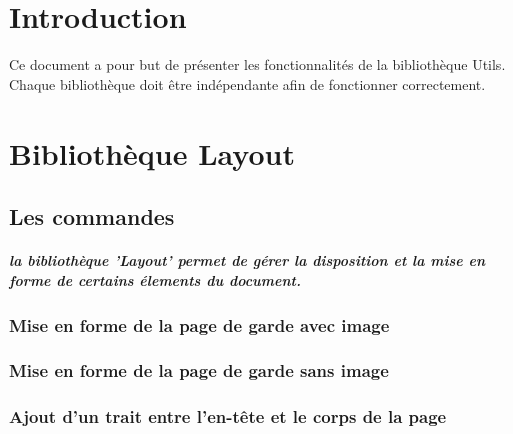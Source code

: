 

\usepackage{lipsum}  





\tableofcontents

\chapter*{Introduction}

Ce document a pour but de présenter les fonctionnalités de la bibliothèque Utils. \n
Chaque bibliothèque doit être indépendante afin de fonctionner correctement.

\arobase

\chapter{Bibliothèque Layout}
\section{Les commandes}

\paragraph{la bibliothèque 'Layout' permet de gérer la disposition et la mise en forme de certains élements du document. \\}

\subsection{Mise en forme de la page de garde avec image}


\subsection{Mise en forme de la page de garde sans image}


\subsection{Ajout d'un trait entre l'en-tête et le corps de la page}


